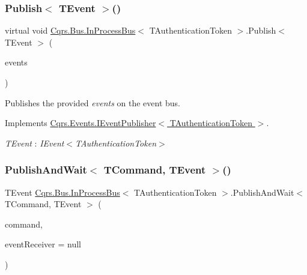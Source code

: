 \subsubsection{\texorpdfstring{Publish$<$ T\+Event $>$()}{Publish< TEvent >()}\hspace{0.1cm}{\footnotesize\ttfamily [2/2]}}
{\footnotesize\ttfamily virtual void \hyperlink{classCqrs_1_1Bus_1_1InProcessBus}{Cqrs.\+Bus.\+In\+Process\+Bus}$<$ T\+Authentication\+Token $>$.Publish$<$ T\+Event $>$ (\begin{DoxyParamCaption}\item[{I\+Enumerable$<$ T\+Event $>$}]{events }\end{DoxyParamCaption})\hspace{0.3cm}{\ttfamily [virtual]}}



Publishes the provided {\itshape events}  on the event bus. 



Implements \hyperlink{interfaceCqrs_1_1Events_1_1IEventPublisher_a2cbcc3d2c24d015abef6337714ec51ff_a2cbcc3d2c24d015abef6337714ec51ff}{Cqrs.\+Events.\+I\+Event\+Publisher$<$ T\+Authentication\+Token $>$}.

\begin{Desc}
\item[Type Constraints]\begin{description}
\item[{\em T\+Event} : {\em I\+Event$<$T\+Authentication\+Token$>$}]\end{description}
\end{Desc}
\mbox{\label{classCqrs_1_1Bus_1_1InProcessBus_a38c0684e313f42bfb36b40703db94ccb_a38c0684e313f42bfb36b40703db94ccb}} 
\subsubsection{\texorpdfstring{Publish\+And\+Wait$<$ T\+Command, T\+Event $>$()}{PublishAndWait< TCommand, TEvent >()}\hspace{0.1cm}{\footnotesize\ttfamily [1/6]}}
{\footnotesize\ttfamily T\+Event \hyperlink{classCqrs_1_1Bus_1_1InProcessBus}{Cqrs.\+Bus.\+In\+Process\+Bus}$<$ T\+Authentication\+Token $>$.Publish\+And\+Wait$<$ T\+Command, T\+Event $>$ (\begin{DoxyParamCaption}\item[{T\+Command}]{command,  }\item[{\hyperlink{interfaceCqrs_1_1Events_1_1IEventReceiver}{I\+Event\+Receiver}$<$ T\+Authentication\+Token $>$}]{event\+Receiver = {\ttfamily null} }\end{DoxyParamCaption})}



